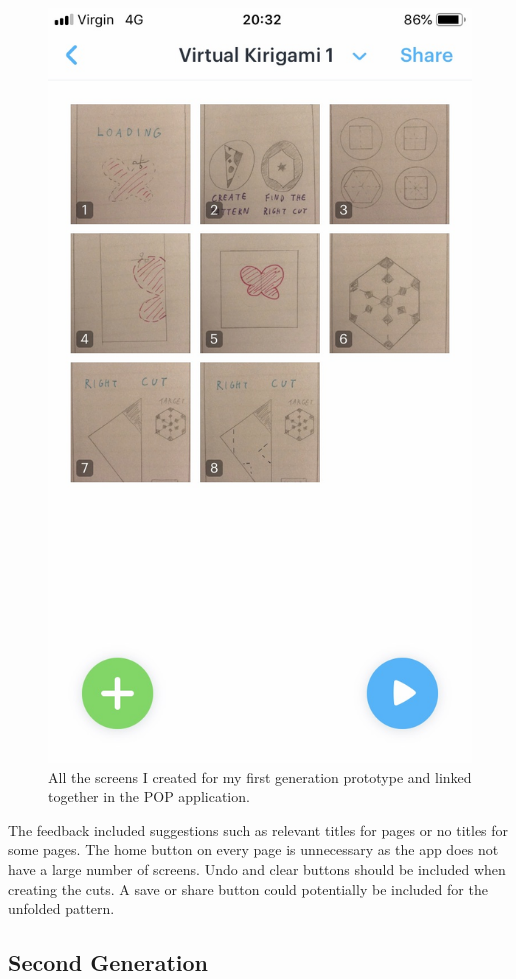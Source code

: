 \documentclass[11pt]{article}
\begin{document}
\begin{figure}[!ht]
\begin{minipage}{0.45\textwidth}
                            \includegraphics[width=0.7\linewidth]{Images/popMultiple}
                            \caption{All the screens I created for my first generation prototype and linked together in the POP application.}
                            \label{fig:popMultiple}
                        \end{minipage}
                    \end{figure}
                    
                The feedback included suggestions such as relevant titles for pages or no titles for some pages. The home button on every page is unnecessary as the app does not have a large number of screens. Undo and clear buttons should be included when creating the cuts. A save or share button could potentially be included for the unfolded pattern.
                 
            
    \subsection{Second Generation}
\end{document}
